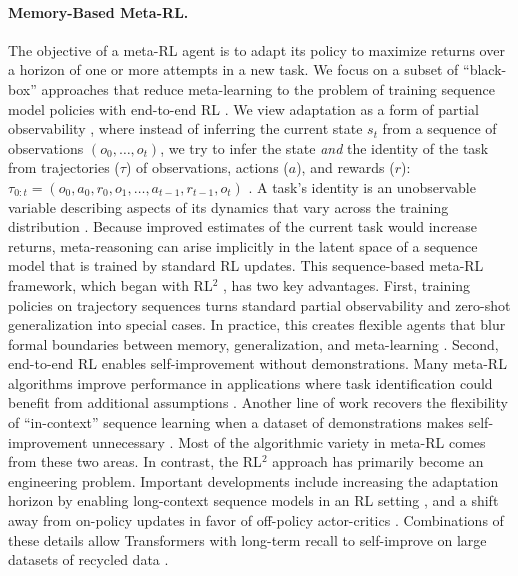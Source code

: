 \documentclass{article}
\begin{document}
\paragraph{Memory-Based Meta-RL.} The objective of a meta-RL agent is to adapt its policy to maximize returns over a horizon of one or more attempts in a new task. We focus on a subset of ``black-box'' approaches that reduce meta-learning to the problem of training sequence model policies with end-to-end RL \cite{beck2023survey}. We view adaptation as a form of partial observability \cite{ghosh2021generalization}, where instead of inferring the current state $s_t$ from a sequence of observations $(o_0, \dots, o_t)$, we try to infer the state \textit{and} the identity of the task from trajectories ($\tau$) of observations, actions ($a$), and rewards ($r$): $\tau_{0:t} = (o_0, a_0, r_0, o_1, \dots, a_{t-1}, r_{t-1}, o_t)$ \cite{zintgraf2022fast}. A task's identity is an unobservable variable describing aspects of its dynamics that vary across the training distribution \cite{hallak2015contextual}. Because improved estimates of the current task would increase returns, meta-reasoning can arise implicitly in the latent space of a sequence model that is trained by standard RL updates.
This sequence-based meta-RL framework, which began with RL$^2$ \cite{wang2016learning, duan2016rl, botvinick2019reinforcement}, has two key advantages. First, training policies on trajectory sequences turns standard partial observability and zero-shot generalization \cite{kirk2022survey} into special cases. In practice, this creates flexible agents that blur formal boundaries between memory, generalization, and meta-learning \cite{benjamins2022contextualize}. Second, end-to-end RL enables self-improvement without demonstrations. Many meta-RL algorithms improve performance in applications where task identification could benefit from additional assumptions \cite{humplik2019meta, liu2021decoupling, rakelly2019efficient, beck2024splagger}. Another line of work recovers the flexibility of ``in-context'' sequence learning when a dataset of demonstrations makes self-improvement unnecessary \cite{laskin2022context, lee2024supervised, raparthy2023generalization, shi2024cross}. Most of the algorithmic variety in meta-RL comes from these two areas. In contrast, the RL$^2$ approach has primarily become an engineering problem. Important developments include increasing the adaptation horizon by enabling long-context sequence models in an RL setting \cite{mishra2017simple, melo2022transformers, lu2023structured}, and a shift away from on-policy updates in favor of off-policy actor-critics \cite{fakoor2019meta, yang2021recurrent, ni2022recurrent}. Combinations of these details allow Transformers with long-term recall to self-improve on large datasets of recycled data \cite{team2023human, ni2023transformers, grigsby2024amago}.
\end{document}
